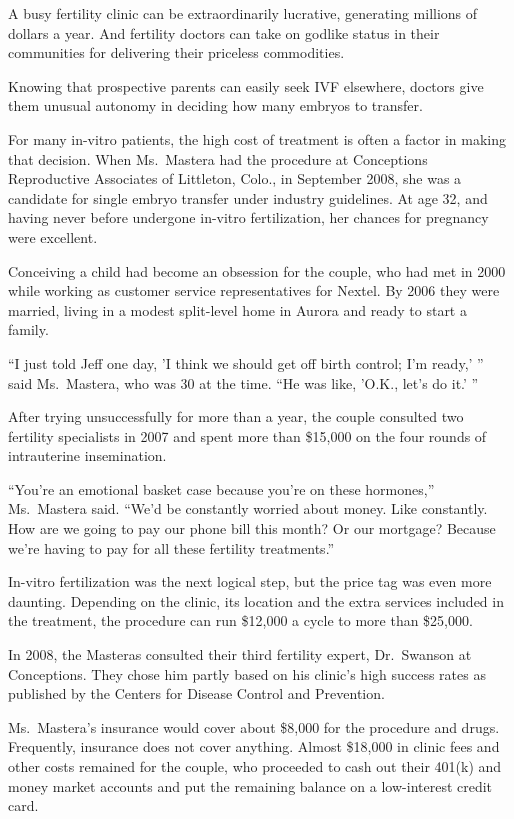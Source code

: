 ﻿\documentclass[12pt]{article}
\begin{document}
A busy fertility clinic can be extraordinarily lucrative, generating millions of dollars a year. And
fertility doctors can take on godlike status in their communities for delivering their priceless
commodities.

Knowing that prospective parents can easily seek IVF elsewhere, doctors give them unusual
autonomy\cite{autonomy} in deciding how many embryos to transfer.

For many in-vitro patients, the high cost of treatment is often a factor in making that decision.
When Ms.~Mastera had the procedure at Conceptions Reproductive Associates of Littleton, Colo., in
September 2008, she was a candidate for single embryo transfer under industry guidelines. At age 32,
and having never before undergone in-vitro fertilization, her chances for pregnancy were excellent.

Conceiving a child had become an obsession for the couple, who had met in 2000 while working as
customer service representatives for Nextel. By 2006 they were married, living in a modest
split-level home in Aurora and ready to start a family.

``I just told Jeff one day, 'I think we should get off birth control; I'm ready,' '' said
Ms.~Mastera, who was 30 at the time. ``He was like, 'O.K., let's do it.' ''

After trying unsuccessfully for more than a year, the couple consulted two fertility specialists in
2007 and spent more than \$15,000 on the four rounds of intrauterine insemination.

``You're an emotional basket case because you're on these hormones,'' Ms.~Mastera said. ``We'd be
constantly worried about money. Like constantly. How are we going to pay our phone bill this month?
Or our mortgage? Because we're having to pay for all these fertility treatments.''

In-vitro fertilization was the next logical step, but the price tag was even more daunting.
Depending on the clinic, its location and the extra services included in the treatment, the
procedure can run \$12,000 a cycle to more than \$25,000.

In 2008, the Masteras consulted their third fertility expert, Dr.~Swanson at Conceptions. They chose
him partly based on his clinic's high success rates as published by the Centers for Disease Control
and Prevention.

Ms.~Mastera's insurance would cover about \$8,000 for the procedure and drugs. Frequently, insurance
does not cover anything. Almost \$18,000 in clinic fees and other costs remained for the couple, who
proceeded to cash out their 401(k) and money market accounts and put the remaining balance on a
low-interest credit card.
\end{document}

